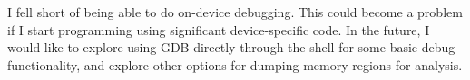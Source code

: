 \documentclass[12pt]{article}
\begin{document}
I fell short of being able to do on-device debugging. This could become a problem if I start programming using significant device-specific code. In the future, I would like to explore using GDB directly through the shell for some basic debug functionality, and explore other options for dumping memory regions for analysis.



\end{document}
